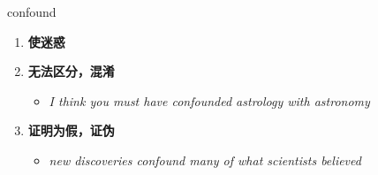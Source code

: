
\begin{frame}
{\huge confound}
\begin{center}
\begin{enumerate}\Large
  \item \textbf{使迷惑}
  \item \textbf{无法区分，混淆}
  \begin{itemize}
    \item \em{\Large{I think you must have confounded astrology with astronomy}}
  \end{itemize}
  \item \textbf{证明为假，证伪}
  \begin{itemize}
    \item \em{\Large{new discoveries confound many of what scientists believed}}
  \end{itemize}
\end{enumerate}
\end{center}
\end{frame}
